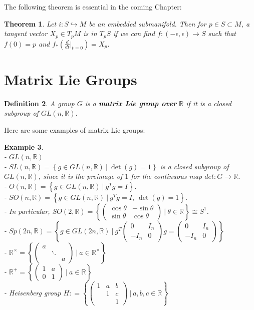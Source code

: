 \documentclass[11pt]{article}
\newtheorem{theorem}{Theorem}[section]
\newtheorem{example}[theorem]{Example}
\newtheorem{definition}[theorem]{Definition}
\newcommand{\bb}[1]{\mathbb{#1}}
\begin{document}
The following theorem is essential in the coming Chapter:
\begin{theorem} \label{embtangent}
Let $i: S \hookrightarrow M$ be an embedded submanifold. Then for $p \in S \subset M$, a tangent vector $X_p \in T_pM$ is in $T_pS$ if we can find $f: (-\epsilon,\epsilon) \to S$ such that $f(0) = p$ and $f_*(\frac{d}{dt}|_{t=0}) = X_p$.
\end{theorem}

\newpage
\section{Matrix Lie Groups}
\begin{definition}
A group $G$ is a \textbf{matrix Lie group over} $\bb{R}$ if it is a closed subgroup of $GL(n,\bb{R})$.
\end{definition}
Here are some examples of matrix Lie groups:
\begin{example} \mbox{}\\
- $GL(n,\bb{R})$\\
- $SL(n,\bb{R}) = \left\{g \in GL(n,\bb{R})\ \Big|\ \det(g) = 1 \right\}$ is a closed subgroup of $GL(n,\bb{R})$, since it is the preimage of $1$ for the continuous map $det: G  \to \bb{R}$.\\
- $O(n,\bb{R}) = \left\{g \in GL(n,\bb{R})\ \Big|\ g^Tg = I \right\}$.\\
- $SO(n,\bb{R}) = \left\{g \in GL(n,\bb{R})\ \Big|\ g^Tg = I,\ \det(g) = 1 \right\}$.\\
- In particular, $SO(2,\bb{R}) = \left\{\left( \begin{array}{cc}
\cos \theta & -\sin \theta \\
\sin \theta & \cos \theta \end{array} \right)\ \Big|\ \theta \in \bb{R} \right\} \cong S^1$.\\
- $Sp(2n,\bb{R})= \left\{g \in GL(2n,\bb{R})\ \Big|\ g^T\left( \begin{array}{cc}
0 & I_n \\
-I_n & 0 \end{array} \right)g = \left( \begin{array}{cc}
0 & I_n \\
-I_n & 0 \end{array} \right) \right\}$\\
- $\bb{R}^{\times} = \left\{ \left( \begin{array}{ccc}
a & & \\
 & \ddots &  \\
& & a \end{array} \right) \ \Big|\ a \in \bb{R}^{\times} \right\}$\\
- $\bb{R}^{+} = \left\{\left( \begin{array}{cc}
1 & a \\
0 & 1 \end{array} \right)\ \Big|\ a \in \bb{R} \right\}$\\
- Heisenberg group $H : = \left\{ \left( \begin{array}{ccc}
1 & a & b \\
 & 1 & c \\
& & 1 \end{array} \right)\ \Big|\ a, b,c \in \bb{R} \right\}$
\end{example}
\end{document}
